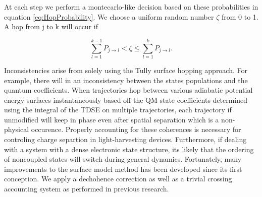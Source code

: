 At each step we perform a montecarlo-like decision based on these probabilities in equation \ref{eq:HopProbability}.
We choose a uniform random number \(\zeta\) from 0 to 1.
A hop from j to k will occur if 

\begin{equation} \label{eq:tullyjump2} 
\sum_{l=1}^{k-1}P_{j \rightarrow l} < \zeta  \le \sum_{l=1}^{k}P_{j \rightarrow l}.
\end{equation}

Inconsistencies arise from solely using the Tully surface hopping approach.
 For example, there will in an inconsistency between the states populations and the quantum coefficients.
 When trajectories hop between various adiabatic potential energy surfaces instantaneously based off the QM state coefficients determined using the integral of the TDSE on multiple trajectories, each trajectory if unmodified will keep in phase even after spatial separation which is a non-physical occurence. \cite{joos2013decoherence,landry2011communication,nelson2013nonadiabatic}
Properly accounting for these coherences is necessary for controling charge separtion in light-harvesting devices.\cite{rozzi2013quantum}
Furthermore, if dealing with a system with a dense electronic state structure, its likely that the ordering of noncoupled states will switch during general dynamics.
Fortunately, many improvements to the surface model method has been developed since its first conception.\cite{fang1999improvement}
We apply a dechohence correction as well as a trivial crossing accounting system as performed in previous research.\cite{nelson2013nonadiabatic,fernandez2012identification}
